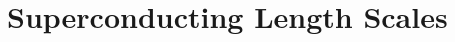 \documentclass[../notes.tex]{subfiles}
\begin{document}
\raggedbottom
	
\chapter{Superconducting Length Scales}




	
\end{document}
